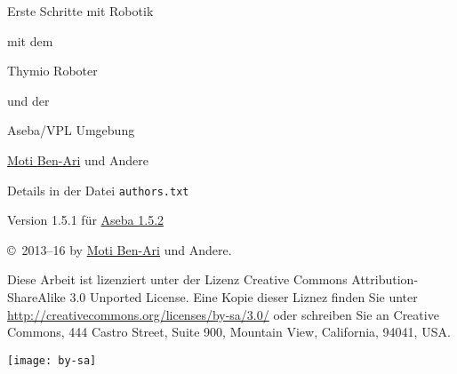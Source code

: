 \thispagestyle{empty}

\begin{center}
\begin{Huge}
\begin{bfseries}
Erste Schritte mit Robotik
\end{bfseries}

mit dem

\begin{bfseries}
Thymio Roboter
\end{bfseries}

und der

\begin{bfseries}
Aseba/VPL Umgebung
\end{bfseries}

\end{Huge}

\vskip 2cm

\begin{LARGE}
\href{http://www.weizmann.ac.il/sci-tea/benari/}{Moti Ben-Ari} und Andere\\
\end{LARGE}
\bigskip
\begin{Large}
Details in der Datei \texttt{authors.txt} 
\end{Large}

\vskip 1cm

\begin{Large}
Version 1.5.1  für  \href{https://www.thymio.org/de:start}{Aseba 1.5.2}
\end{Large}

\end{center}

\vfill

\begin{center}
\copyright{}\  2013--16 by \href{http://www.weizmann.ac.il/sci-tea/benari/}{Moti Ben-Ari} und Andere.
\end{center}

Diese Arbeit ist lizenziert unter der Lizenz Creative Commons Attribution-ShareAlike 3.0 Unported License. Eine Kopie dieser Liznez finden Sie unter  \href{http://creativecommons.org/licenses/by-sa/3.0/}{http://creativecommons.org/licenses/by-sa/3.0/}
oder schreiben Sie an Creative Commons, 444 Castro Street, Suite 900,
Mountain View, California, 94041, USA.

\begin{center}
\texttt{[image: by-sa]}
\end{center}

\newpage
\thispagestyle{empty}
\begin{spacing}{0.7}
\tableofcontents
\end{spacing}
\newpage
\setcounter{page}{1}
